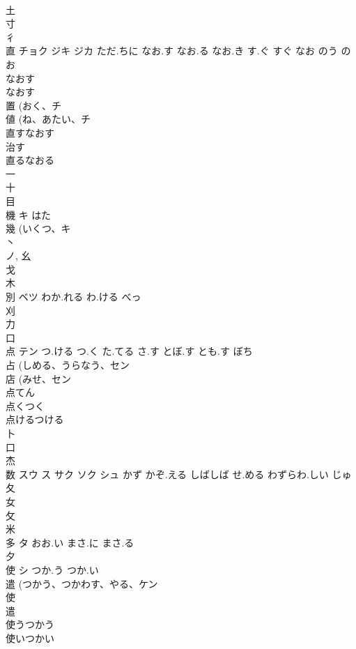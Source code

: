 \documentclass[8pt]{extreport}
\begin{document}
\begin{CJK}{UTF8}{min}
\\	土 
\\	寸 
\\	彳 
\\	直	チョク ジキ ジカ	ただ.ちに なお.す なお.る なお.き す.ぐ すぐ なお のう のお	
\\	なおす 
\\	なおす 
\\	置 (おく、チ 
\\	値 (ね、あたい、チ 
\\	直すなおす
\\	治す 
\\	直るなおる
\\	一 
\\	十 
\\	目 
\\	機	キ	はた	
\\	幾 (いくつ、キ 
\\	丶 
\\	ノ, 幺 
\\	戈 
\\	木 
\\	別	ベツ	わか.れる わ.ける べっ	
\\	刈 
\\	力 
\\	口 
\\	点	テン	つ.ける つ.く た.てる さ.す とぼ.す とも.す ぼち	
\\	占 (しめる、うらなう、セン 
\\	店 (みせ、セン 
\\	点てん
\\	点くつく
\\	点けるつける
\\	卜 
\\	口 
\\	杰	
\\	数	スウ ス サク ソク シュ	かず かぞ.える しばしば せ.める わずらわ.しい じゅ	
\\	夂 
\\	女 
\\	攵 
\\	米 
\\	多	タ	おお.い まさ.に まさ.る	
\\	夕 
\\	使	シ	つか.う つか.い	
\\	遣 (つかう、つかわす、やる、ケン 
\\	使 
\\	遣 
\\	使うつかう 
\\	使いつかい 

\end{CJK}
\end{document}
